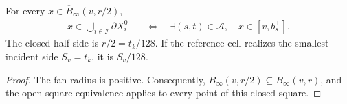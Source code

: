 \begin{lemma}
    \label{thm:area_law_initial_active_radial_closed}
    \leanok
    For every $x\in\overline B_\infty(v,r/2)$,
    \begin{align}
        x\in\bigcup_{i\in\mathcal I}\partial X_i^0
         & \quad\Longleftrightarrow\quad
        \exists(s,t)\in\mathcal A,\quad x\in[v,b_s^+].
    \end{align}
    The closed half-side is $r/2=t_k/128$. If the reference cell
    realizes the smallest incident side $S_v=t_k$, it is $S_v/128$.
\end{lemma}
\begin{proof}\leanok
    The fan radius is positive. Consequently,
    $\overline B_\infty(v,r/2)\subseteq B_\infty(v,r)$, and the
    open-square equivalence applies to every point of this closed square.
\end{proof}


